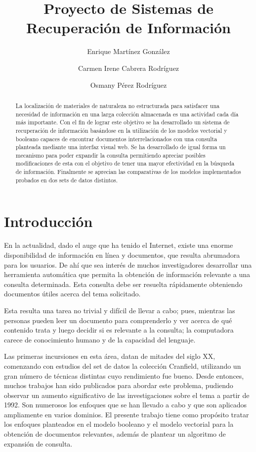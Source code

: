\documentclass{llncs}
\title{Proyecto de Sistemas de Recuperación de Información}
\author{Enrique Martínez González \and Carmen Irene Cabrera Rodríguez \and Osmany Pérez Rodríguez}
\institute{C512}
\begin{document}
\maketitle

\begin{abstract}
    La localización de materiales de naturaleza no estructurada para satisfacer una necesidad de información en una larga colección almacenada es una actividad cada día más importante. Con el fin de lograr este objetivo se ha desarrollado un sistema de recuperación de información basándose en la utilización de los modelos vectorial y booleano capaces de encontrar documentos interrelacionados con una consulta planteada mediante una interfaz visual web. Se ha desarrollado de igual forma un mecanismo para poder expandir la consulta permitiendo apreciar posibles modificaciones de esta con el objetivo de tener una mayor efectividad en la búsqueda de información. Finalmente se aprecian las comparativas de los modelos implementados probados en dos sets de datos distintos.
\end{abstract}



\newpage
\tableofcontents
\newpage


\section{Introducción}
En la actualidad, dado el auge que ha tenido el Internet, existe una enorme disponibilidad de información en línea y documentos, que resulta abrumadora para los usuarios. De ahí que sea interés de muchos investigadores desarrollar una herramienta automática que permita la obtención de información relevante a una consulta determinada. Esta consulta debe ser resuelta rápidamente obteniendo documentos útiles acerca del tema solicitado.

Esta resulta una tarea no trivial y difícil de llevar a cabo; pues, mientras las personas pueden leer un documento para comprenderlo y ver acerca de qué contenido trata y luego decidir si es relevante a la consulta; la computadora carece de conocimiento humano y de la capacidad del lenguaje.

Las primeras incursiones en esta área, datan de mitades del siglo XX, comenzando con estudios del set de datos la colección Cranfield, utilizando un gran número de técnicas distintas cuyo rendimiento fue bueno. Desde entonces, muchos trabajos han sido publicados para abordar este problema, pudiendo observar un aumento significativo de las investigaciones sobre el tema a partir de 1992. Son numerosos los enfoques que se han llevado a cabo y que son aplicados ampliamente en
varios dominios. El presente trabajo tiene como propósito tratar los enfoques planteados en el modelo booleano y el modelo vectorial para la obtención de documentos relevantes, además de plantear un algoritmo de expansión de consulta.
\end{document}
